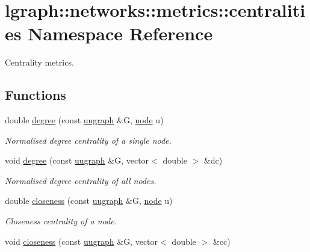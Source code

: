 \hypertarget{namespacelgraph_1_1networks_1_1metrics_1_1centralities}{}\section{lgraph\+:\+:networks\+:\+:metrics\+:\+:centralities Namespace Reference}
\label{namespacelgraph_1_1networks_1_1metrics_1_1centralities}


Centrality metrics.  


\subsection*{Functions}
\begin{DoxyCompactItemize}
\item 
double \hyperlink{namespacelgraph_1_1networks_1_1metrics_1_1centralities_a587a7cd32f7d59138fd7a327c902b4ab}{degree} (const \hyperlink{classlgraph_1_1utils_1_1uugraph}{uugraph} \&G, \hyperlink{namespacelgraph_1_1utils_a7bd66ede3805ef121bc2835bd48de0cf}{node} u)
\begin{DoxyCompactList}\small\item\em Normalised degree centrality of a single node. \end{DoxyCompactList}\item 
void \hyperlink{namespacelgraph_1_1networks_1_1metrics_1_1centralities_a550503d0a4429f9eb993d6a739130853}{degree} (const \hyperlink{classlgraph_1_1utils_1_1uugraph}{uugraph} \&G, vector$<$ double $>$ \&dc)
\begin{DoxyCompactList}\small\item\em Normalised degree centrality of all nodes. \end{DoxyCompactList}\item 
double \hyperlink{namespacelgraph_1_1networks_1_1metrics_1_1centralities_a93bddce29621b2d88b633971bcf0ba3c}{closeness} (const \hyperlink{classlgraph_1_1utils_1_1uugraph}{uugraph} \&G, \hyperlink{namespacelgraph_1_1utils_a7bd66ede3805ef121bc2835bd48de0cf}{node} u)
\begin{DoxyCompactList}\small\item\em Closeness centrality of a node. \end{DoxyCompactList}\item 
void \hyperlink{namespacelgraph_1_1networks_1_1metrics_1_1centralities_a7405d3e9a93d0b4d8c1898e2456acea9}{closeness} (const \hyperlink{classlgraph_1_1utils_1_1uugraph}{uugraph} \&G, vector$<$ double $>$ \&cc)

\end{DoxyCompactItemize}
